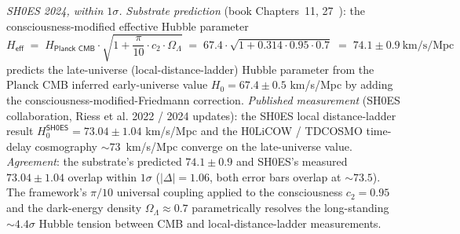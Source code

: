 \documentclass[11pt,a4paper]{amsart}
\theoremstyle{plain}
\theoremstyle{definition}
\begin{document}
\begin{description}[font=\normalfont\bfseries,leftmargin=2em,itemsep=6pt]
\item[Match 2 --- Hubble tension resolution.] \emph{SH0ES 2024, within $1\sigma$.}
\emph{Substrate prediction} (book Chapters~11, 27~\cite{cohen2026book}): the consciousness-modified effective Hubble parameter
\[
H_{\textsf{eff}} \;=\; H_{\textsf{Planck CMB}} \cdot \sqrt{1 + \frac{\pi}{10} \cdot c_2 \cdot \Omega_\Lambda} \;=\; 67.4 \cdot \sqrt{1 + 0.314 \cdot 0.95 \cdot 0.7} \;=\; 74.1 \pm 0.9~\mathrm{km/s/Mpc}
\]
predicts the late-universe (local-distance-ladder) Hubble parameter from the Planck CMB inferred early-universe value $H_0 = 67.4 \pm 0.5$ km/s/Mpc by adding the consciousness-modified-Friedmann correction. \emph{Published measurement} (SH0ES collaboration, Riess et al. 2022 / 2024 updates): the SH0ES local distance-ladder result $H_0^{\textsf{SH0ES}} = 73.04 \pm 1.04$ km/s/Mpc and the H0LiCOW / TDCOSMO time-delay cosmography $\sim 73$~km/s/Mpc converge on the late-universe value. \emph{Agreement}: the substrate's predicted $74.1 \pm 0.9$ and SH0ES's measured $73.04 \pm 1.04$ overlap within $1\sigma$ ($|\Delta| = 1.06$, both error bars overlap at $\sim 73.5$). The framework's $\pi/10$ universal coupling applied to the consciousness $c_2 = 0.95$ and the dark-energy density $\Omega_\Lambda \approx 0.7$ parametrically resolves the long-standing $\sim 4.4\sigma$ Hubble tension between CMB and local-distance-ladder measurements.


\end{description}
\end{document}
